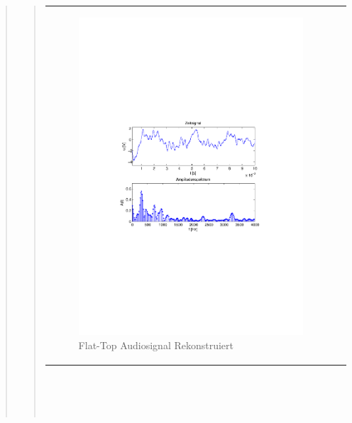 \begin{quote}
\begin{quote}
\begin{center}
\begin{tabular}{ll}
                \begin{minipage}{0.6\textwidth}
                    \begin{figure}[H]
                       \includegraphics[scale=0.55, trim = 16mm 70mm 16mm 85mm, clip]{Bilder/audioflat}
                       \caption{Flat-Top Audiosignal Rekonstruiert}
		              \label{fig:flataudio}
                    \end{figure}
                \end{minipage}
            
            \end{tabular}
            \end{center}
            \ \\
            \ \\
            \ \\
    
      \end{quote}
      
      
\end{quote}










